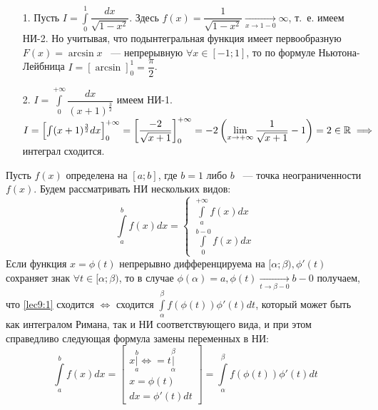 \documentclass[../../main.tex]{subfiles}
\begin{document}
\begin{exmps}
\begin{enumerate}
	\item[1.] Пусть $ I = \int\limits_{0}^1 \dfrac{dx}{\sqrt{1 - x^2}} $.
	Здесь $ f(x) = \dfrac{1}{\sqrt{1 - x^2}} \underset{x \to 1 - 0}{\to}
	\infty $, т.~е. имеем НИ-2. Но учитывая, что подынтегральная функция 
	имеет первообразную $ F(x) = \arcsin{x} $ ~--- непрерывную $ \forall x
	\in [-1; 1] $, то по формуле Ньютона-Лейбница $ 
	I = \left[\arcsin \right]_0^1 = \dfrac{\pi}{2} $.
	\item[2.] $ I = \int\limits_{0}^{+\infty} \dfrac{dx}{(x + 1)^{\frac{3}{2}}}$
	имеем НИ-1. $ I = \left[ \int (x + 1)^{\frac{3}{2}} dx\right]_0^{+\infty} 
	= \left[ \dfrac{-2}{\sqrt{x + 1}} \right]_0^{+\infty} = -2 \left(
	\lim\limits_{x \to + \infty} \dfrac{1}{\sqrt{x + 1}} - 1 \right) = 2
	\in \mathbb{R} \implies $ интеграл сходится.
\end{enumerate}
\end{exmps}
\begin{thm}
	Пусть $ f(x) $ определена на $ [a; b] $, где $ b = 1 $ либо $ b $ ~---
	точка неограниченности $ f(x) $. %
	Будем рассматривать НИ нескольких видов:
	\begin{equation}
		\label{lec9:1}
		\int\limits_a^b f(x) dx = 
		\begin{cases}
			\int\limits_a^{+\infty} f(x) dx\\
			\int\limits_{0}^{b - 0} f(x) dx
		\end{cases}
	\end{equation}
	Если функция $ x = \phi(t) $ непрерывно дифференцируема на $ [\alpha; \beta)
	, \phi'(t) $ сохраняет знак $ \forall t \in [\alpha; \beta) $, то
	в случае $ \phi(\alpha) = a, \phi(t) \underset{t \to \beta - 0}{\to} b - 0
	$ получаем, что \eqref{lec9:1} сходится $\iff$ сходится
	$ \int\limits_\alpha^\beta f(\phi(t)) \phi'(t) dt $, который может быть как
	интегралом Римана, так и НИ соответствующего вида, и при этом справедливо 
	следующая формула замены переменных в НИ:
	\begin{equation}
		\label{lec9:2}
		\int\limits_a^b f(x) dx = 
		\begin{bmatrix}
			x|\limits_a^b \iff= t|\limits_\alpha^\beta\\
			x = \phi(t)\\
			dx = \phi'(t)dt
		\end{bmatrix} =
		\int\limits_\alpha^\beta f(\phi(t)) \phi'(t) dt
	\end{equation}
\end{thm}
\end{document}
